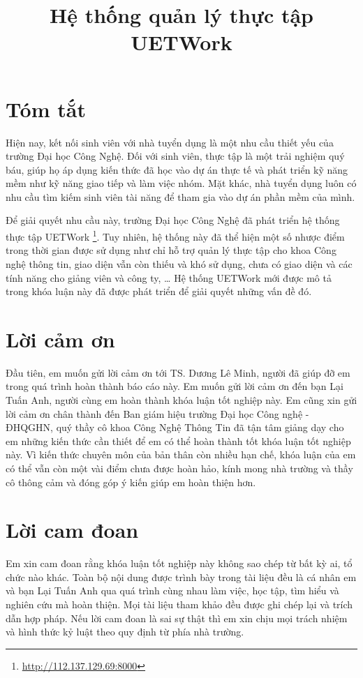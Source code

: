 \documentclass[12pt,a4paper]{report}
\title{Hệ thống quản lý thực tập UETWork}
\begin{document}

\clearpage{}

\chapter*{Tóm tắt}

Hiện nay, kết nối sinh viên với nhà tuyển dụng là một nhu cầu thiết yếu của trường Đại học Công Nghệ. Đối với sinh viên, thực tập là một trải nghiệm quý báu, giúp họ áp dụng kiến thức đã học vào dự án thực tế và phát triển kỹ năng mềm như kỹ năng giao tiếp và làm việc nhóm. Mặt khác, nhà tuyển dụng luôn có nhu cầu tìm kiếm sinh viên tài năng để tham gia vào dự án phần mềm của mình.

Để giải quyết nhu cầu này, trường Đại học Công Nghệ đã phát triển hệ thống thực tập UETWork \footnote{\url{http://112.137.129.69:8000}}. Tuy nhiên, hệ thống này đã thể hiện một số nhược điểm trong thời gian được sử dụng như chỉ hỗ trợ quản lý thực tập cho khoa Công nghệ thông tin, giao diện vẫn còn thiếu và khó sử dụng, chưa có giao diện và các tính năng cho giảng viên và công ty, \ldots{} Hệ thống UETWork mới được mô tả trong khóa luận này đã được phát triển để giải quyết những vấn đề đó.

\chapter*{Lời cảm ơn}

Đầu tiên, em muốn gửi lời cảm ơn tới TS. Dương Lê Minh, người đã giúp đỡ em trong quá trình hoàn thành báo cáo này. Em muốn gửi lời cảm ơn đến bạn Lại Tuấn Anh, người cùng em hoàn thành khóa luận tốt nghiệp này.
Em cũng xin gửi lời cảm ơn chân thành đến Ban giám hiệu trường Đại học Công nghệ - ĐHQGHN, quý thầy cô khoa Công Nghệ Thông Tin đã tận tâm giảng dạy cho em những kiến thức cần thiết để em có thể hoàn thành tốt khóa luận tốt nghiệp này.
Vì kiến thức chuyên môn của bản thân còn nhiều hạn chế, khóa luận của em có thể vẫn còn một vài điểm chưa được hoàn hảo, kính mong nhà trường và thầy cô thông cảm và đóng góp ý kiến giúp em hoàn thiện hơn.

\chapter*{Lời cam đoan}

Em xin cam đoan rằng khóa luận tốt nghiệp này không sao chép từ bất kỳ ai, tổ chức nào khác. Toàn bộ nội dung được trình bày trong tài liệu đều là cá nhân em và bạn Lại Tuấn Anh qua quá trình cùng nhau làm việc, học tập, tìm hiểu và nghiên cứu mà hoàn thiện. Mọi tài liệu tham khảo đều được ghi chép lại và trích dẫn hợp pháp. Nếu lời cam đoan là sai sự thật thì em xin chịu mọi trách nhiệm và hình thức kỷ luật theo quy định từ phía nhà trường.
\end{document}

